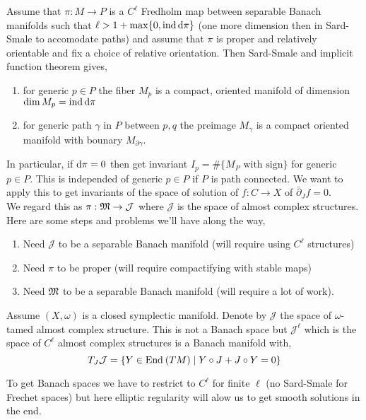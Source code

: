 \documentclass[12pt]{article}
\newcommand{\dbar}{\bar{\partial}}
\DeclareMathOperator{\ind}{\mathrm{ind}}
\begin{document}
\begin{cor}
Assume that $\pi : M \to P$ is a $C^\ell$ Fredholm map between separable Banach manifolds such that $\ell > 1 + \max \{ 0, \ind{\d{\pi}} \}$ (one more dimension then in Sard-Smale to accomodate paths) and assume that $\pi$ is proper and relatively orientable and fix a choice of relative orientation. Then Sard-Smale and implicit function theorem gives,
\begin{enumerate}
\item for generic $p \in P$ the fiber $M_p$ is a compact, oriented manifold of dimension $\dim{M_p} = \ind{\d{\pi}}$
\item for generic path $\gamma$ in $P$ between $p, q$ the preimage $M_\gamma$ is a compact oriented manifold with bounary $M_{\partial \gamma}$. 
\end{enumerate}
\end{cor}

\newcommand{\cJ}{\mathcal{J}}

In particular, if $\mathrm{d}{\pi} = 0$ then get invariant $I_p = \# \{ M_P \text{ with sign} \}$ for generic $p \in P$. This is independed of generic $p \in P$ if $P$ is path connected. We want to apply this to get invariants of the space of solution of $f : C \to X$ of $\dbar_J f = 0$. 
\bigskip\\
We regard this as $\pi : \mf{M} \to \cJ$ where $\cJ$ is the space of almost complex structures. Here are some steps and problems we'll have along the way,
\begin{enumerate}
\item Need $\cJ$ to be a separable Banach manifold (will require using $C^\ell$ structures)
\item Need $\pi$ to be proper (will require compactifying with stable maps)
\item Need $\mathfrak{M}$ to be a separable Banach manifold (will require a lot of work). 
\end{enumerate}

\begin{rmk}
Assume $(X, \omega)$ is a closed symplectic manifold. Denote by $\cJ$ the space of $\omega$-tamed almost complex structure. This is not a Banach space but $\cJ^\ell$ which is the space of $C^\ell$ almost complex structures is a Banach manifold with,
\[ T_{J} \cJ = \{ Y \in \End{TM} \mid Y \circ J  + J \circ Y = 0 \} \]
\end{rmk}

\begin{rmk}
To get Banach spaces we have to restrict to $C^\ell$ for finite $\ell$ (no Sard-Smale for Frechet spaces) but here elliptic regularity will alow us to get smooth solutions in the end. 
\end{rmk}
\end{document}

